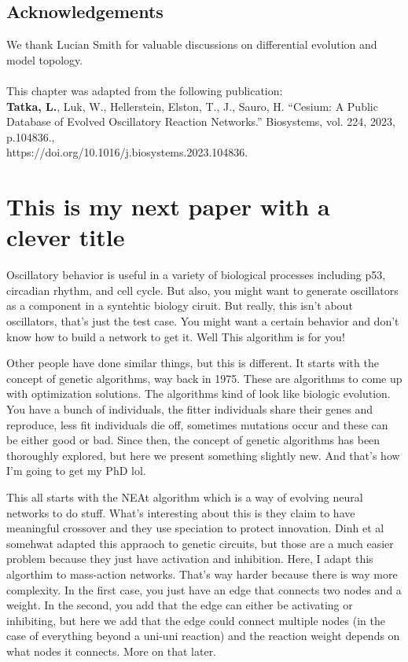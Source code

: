 \documentclass[12pt]{report}
\begin{document}
\section*{Acknowledgements}
We thank Lucian Smith for valuable discussions on differential evolution and model topology. 
\\
\\
This chapter was adapted from the following publication:
\\
\textbf{Tatka, L.}, Luk, W., Hellerstein, Elston, T., J., Sauro, H. “Cesium: A Public Database of Evolved Oscillatory Reaction Networks.”  Biosystems, vol. 224, 2023, p.104836., \\
https://doi.org/10.1016/j.biosystems.2023.104836. 
\\


\chapter{This is my next paper with a clever title}

Oscillatory behavior is useful in a variety of biological processes including p53, circadian rhythm, and cell cycle. But also, you might want to generate oscillators as a component in a syntehtic biology ciruit. But really, this isn't about oscillators, that's just the test case. You might want a certain behavior and don't know how to build a  network to get it. Well This algorithm is for you! 

Other people have done similar things, but this is different. It starts with the concept of genetic algorithms, way back in 1975. These are algorithms to come up with optimization solutions. The algorithms kind of look like biologic evolution. You have a bunch of individuals, the fitter individuals share their genes and reproduce, less fit individuals die off, sometimes mutations occur and these can be either good or bad. Since then, the concept of genetic algorithms has been thoroughly explored, but here we present something slightly new. And that's how I'm going to get my PhD lol.

This all starts with the NEAt algorithm which is a way of evolving neural networks to do stuff.  What's interesting about this is they claim to have meaningful crossover and they use speciation to protect innovation. Dinh et al somehwat adapted this appraoch to genetic circuits, but those are a much easier problem because they just have activation and inhibition. Here, I adapt this algorthim to mass-action networks. That's way harder because there is way more complexity. In the first case, you just have an edge that connects two nodes and a weight. In the second, you add that the edge can either be activating or inhibiting, but here we add that the edge could connect multiple nodes (in the case of everything beyond a uni-uni reaction) and the reaction weight depends on what nodes it connects. More on that later.
\end{document}
